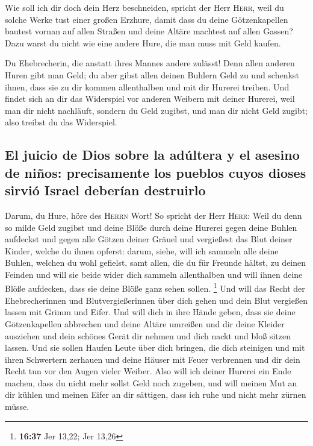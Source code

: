  Wie soll ich dir doch dein Herz beschneiden, spricht der
Herr \textsc{Herr}, weil du solche Werke tust einer großen Erzhure,
 damit dass du deine Götzenkapellen bautest vornan auf
allen Straßen und deine Altäre machtest auf allen Gassen? Dazu warst du
nicht wie eine andere Hure, die man muss mit Geld kaufen.

 Du Ehebrecherin, die anstatt ihres Mannes andere
zulässt!  Denn allen anderen Huren gibt man Geld; du aber
gibst allen deinen Buhlern Geld zu und schenkst ihnen, dass sie zu dir
kommen allenthalben und mit dir Hurerei treiben.  Und
findet sich an dir das Widerspiel vor anderen Weibern mit deiner
Hurerei, weil man dir nicht nachläuft, sondern du Geld zugibst, und man
dir nicht Geld zugibt; also treibst du das Widerspiel.

\hypertarget{el-juicio-de-dios-sobre-la-aduxfaltera-y-el-asesino-de-niuxf1os-precisamente-los-pueblos-cuyos-dioses-sirviuxf3-israel-deberuxedan-destruirlo}{%
\subsection{El juicio de Dios sobre la adúltera y el asesino de niños:
precisamente los pueblos cuyos dioses sirvió Israel deberían
destruirlo}\label{el-juicio-de-dios-sobre-la-aduxfaltera-y-el-asesino-de-niuxf1os-precisamente-los-pueblos-cuyos-dioses-sirviuxf3-israel-deberuxedan-destruirlo}}

 Darum, du Hure, höre des \textsc{Herrn} Wort!
 So spricht der Herr \textsc{Herr}: Weil du denn so milde
Geld zugibst und deine Blöße durch deine Hurerei gegen deine Buhlen
aufdeckst und gegen alle Götzen deiner Gräuel und vergießest das Blut
deiner Kinder, welche du ihnen opferst:  darum, siehe,
will ich sammeln alle deine Buhlen, welchen du wohl gefielst, samt
allen, die du für Freunde hältst, zu deinen Feinden und will sie beide
wider dich sammeln allenthalben und will ihnen deine Blöße aufdecken,
dass sie deine Blöße ganz sehen sollen. \footnote{\textbf{16:37} Jer
  13,22; Jer 13,26}  Und will das Recht der
Ehebrecherinnen und Blutvergießerinnen über dich gehen und dein Blut
vergießen lassen mit Grimm und Eifer.  Und will dich in
ihre Hände geben, dass sie deine Götzenkapellen abbrechen und deine
Altäre umreißen und dir deine Kleider ausziehen und dein schönes Gerät
dir nehmen und dich nackt und bloß sitzen lassen.  Und
sie sollen Haufen Leute über dich bringen, die dich steinigen und mit
ihren Schwertern zerhauen  und deine Häuser mit Feuer
verbrennen und dir dein Recht tun vor den Augen vieler Weiber. Also will
ich deiner Hurerei ein Ende machen, dass du nicht mehr sollst Geld noch
zugeben,  und will meinen Mut an dir kühlen und meinen
Eifer an dir sättigen, dass ich ruhe und nicht mehr zürnen müsse.


